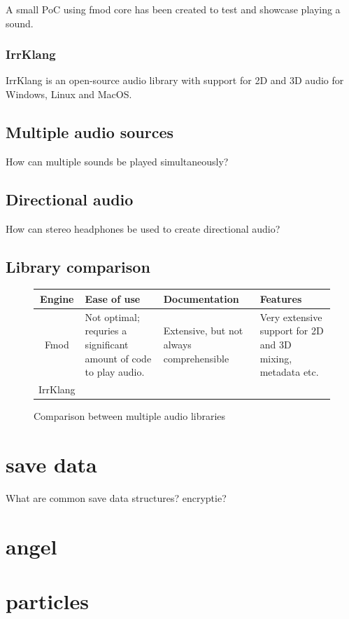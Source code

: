 \documentclass{article} %
\begin{document}
A small PoC using fmod core has been created to test and showcase playing a sound.

\subsubsection{IrrKlang}
IrrKlang is an open-source audio library with support for 2D and 3D audio for Windows, Linux and MacOS.

\subsection{Multiple audio sources}
How can multiple sounds be played simultaneously?
\subsection{Directional audio}
How can stereo headphones be used to create directional audio?
\subsection{Library comparison}
\begin{figure}[h!]
	\centering
    \begin{tabularx}{\textwidth}{|c|X|X|X|} \hline
        \textbf{Engine} & \textbf{Ease of use} & \textbf{Documentation} & \textbf{Features} \\ \hline
        Fmod & Not optimal; requries a significant amount of code to play audio. & Extensive, but not always comprehensible & Very extensive support for 2D and 3D mixing, metadata etc. \\ \hline
        IrrKlang & & & \\ \hline
    \end{tabularx}
    \caption{Comparison between multiple audio libraries}
	\label{fig:audioLibComparison}
\end{figure}

\section{save data}
What are common save data structures?
encryptie?
\newpage

\section{angel}
\section{particles}
\end{document}
